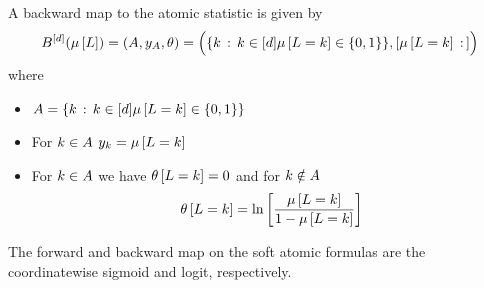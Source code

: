 A backward map to the atomic statistic is given by
\begin{align*}
    B^{[d]}(\mu\left[L\right])
    =(A,y_{A},\theta)
    = \Big(\{k\,:\,k\in[d]\mu\left[L=k\right]\in\{0,1\}\}, [\mu\left[L=k\right]\,:\, ] \Big)
\end{align*}
where
\begin{itemize}
    \item $A = \{k\,:\,k\in[d]\mu\left[L=k\right]\in\{0,1\}\}$
    \item For $k\in A$ $y_{k}=\mu\left[L=k\right]$
    \item For $k\in A$ we have $\theta\left[L=k\right]=0$ and for $k\notin A$
    \begin{align*} %
        \canparamat{\selvariable=\atomenumerator}
        = \lnof{\frac{\meanparamat{\selvariable=\atomenumerator}}{1-\meanparamat{\selvariable=\atomenumerator}}}
    \end{align*}
\end{itemize}

The forward and backward map on the soft atomic formulas are the coordinatewise sigmoid and logit, respectively.

